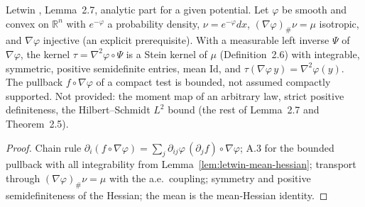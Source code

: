 \begin{lemma}
  \label{lem:letwin-hessian-kernel}
  \leanok
  Letwin \cite{Letwin2026QuadraticKLS}, Lemma~2.7, analytic part for a given potential. Let
  $\varphi$ be smooth and convex on $\mathbb R^n$ with $e^{-\varphi}$ a probability density,
  $\nu=e^{-\varphi}dx$, $(\nabla\varphi)_\#\nu=\mu$ isotropic, and $\nabla\varphi$ injective (an
  explicit prerequisite). With a measurable left inverse $\Psi$ of $\nabla\varphi$, the kernel
  $\tau=\nabla^2\varphi\circ\Psi$ is a Stein kernel of $\mu$ (Definition~2.6) with integrable,
  symmetric, positive semidefinite entries, mean $\mathrm{Id}$, and $\tau(\nabla\varphi\,y)=\nabla^2\varphi(y)$.
  The pullback $f\circ\nabla\varphi$ of a compact test is bounded, not assumed compactly
  supported. Not provided: the moment map of an arbitrary law, strict positive definiteness,
  the Hilbert--Schmidt $L^2$ bound (the rest of Lemma~2.7 and Theorem~2.5).
\end{lemma}
\begin{proof}
  \leanok
  Chain rule $\partial_i(f\circ\nabla\varphi)=\sum_j\partial_{ij}\varphi\,(\partial_jf)\circ\nabla\varphi$;
  A.3 for the bounded pullback with all integrability from Lemma~\ref{lem:letwin-mean-hessian};
  transport through $(\nabla\varphi)_\#\nu=\mu$ with the a.e.\ coupling; symmetry and positive
  semidefiniteness of the Hessian; the mean is the mean-Hessian identity.
\end{proof}

